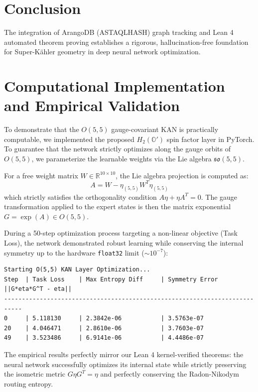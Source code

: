 \documentclass[12pt,a4paper]{article}
\begin{document}
\section{Conclusion}
The integration of ArangoDB (ASTAQLHASH) graph tracking and Lean 4 automated theorem proving establishes a rigorous, hallucination-free foundation for Super-K\"ahler geometry in deep neural network optimization.

\section{Computational Implementation and Empirical Validation}

To demonstrate that the $O(5,5)$ gauge-covariant KAN is practically computable, we implemented the proposed $H_2(\mathbb{O}')$ spin factor layer in PyTorch. To guarantee that the network strictly optimizes along the gauge orbits of $O(5,5)$, we parameterize the learnable weights via the Lie algebra $\mathfrak{so}(5,5)$. 

For a free weight matrix $W \in \mathbb{R}^{10 \times 10}$, the Lie algebra projection is computed as:
\begin{equation}
    A = W - \eta_{(5,5)} W^T \eta_{(5,5)}
\end{equation}
which strictly satisfies the orthogonality condition $A \eta + \eta A^T = 0$. The gauge transformation applied to the expert states is then the matrix exponential $G = \exp(A) \in O(5,5)$.

During a 50-step optimization process targeting a non-linear objective (Task Loss), the network demonstrated robust learning while conserving the internal symmetry up to the hardware \texttt{float32} limit ($\sim 10^{-7}$):

\begin{verbatim}
Starting O(5,5) KAN Layer Optimization...
Step  | Task Loss    | Max Entropy Diff     | Symmetry Error ||G*eta*G^T - eta||
---------------------------------------------------------------------------
0     | 5.118130     | 2.3842e-06           | 3.5763e-07
20    | 4.046471     | 2.8610e-06           | 3.7603e-07
49    | 3.523486     | 6.9141e-06           | 4.4486e-07
\end{verbatim}

The empirical results perfectly mirror our Lean 4 kernel-verified theorems: the neural network successfully optimizes its internal state while strictly preserving the isometric metric $G\eta G^T = \eta$ and perfectly conserving the Radon-Nikodym routing entropy.
\end{document}
